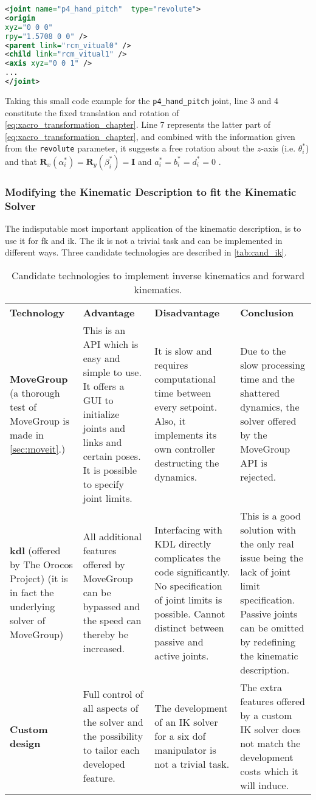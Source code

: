 \begin{lstlisting}[language=xml]
<joint name="p4_hand_pitch"  type="revolute">
<origin
xyz="0 0 0"
rpy="1.5708 0 0" />
<parent link="rcm_vitual0" />
<child link="rcm_vitual1" />
<axis xyz="0 0 1" />
...
</joint>
\end{lstlisting}
Taking this small code example for the \texttt{p4\_hand\_pitch} joint, line 3 and 4 constitute the fixed translation and rotation of \autoref{eq:xacro_transformation_chapter}. Line 7 represents the latter part of \autoref{eq:xacro_transformation_chapter}, and combined with the information given from the \texttt{revolute} parameter, it suggests a free rotation about the $z$-axis (i.e. $\theta_i^*$) and that  $\textbf{R}_x(\alpha_i^*)  = \textbf{R}_y(\beta_i^*) = \mathbf{I}$ and $a_i^* = b_i^* = d_i^* = 0$ .

\subsubsection{Modifying the Kinematic Description to fit the Kinematic Solver}
The indisputable most important application of the kinematic description, is to use it for \gls{fk} and  \gls{ik}. The \gls{ik} is not a trivial task and can be implemented in different ways. Three candidate technologies are described in \autoref{tab:cand_ik}.
\begin{table}[H]
\begin{tabularx}{\textwidth}{X X X X}
\rowcolor{HeaderBlue} 
\textbf{Technology} &  \textbf{Advantage} &  \textbf{Disadvantage} & \textbf{Conclusion} \\
\textbf{MoveGroup} (a thorough test of MoveGroup is made in \autoref{sec:moveit}.) & This is an API which is easy and simple to use. It offers a GUI to initialize joints and links and certain poses. It is possible to specify joint limits. & It is slow and requires computational time between every setpoint. Also, it implements its own controller destructing the dynamics. & Due to the slow processing time and the shattered dynamics, the solver offered by the MoveGroup API is rejected. \\
\rowcolor{textBlue} 
\textbf{\gls{kdl}} (offered by The Orocos Project) (it is in fact the underlying solver of MoveGroup) & All additional features offered by MoveGroup can be bypassed and the speed can thereby be increased. & Interfacing with KDL directly complicates the code significantly. No specification of joint limits is possible. Cannot distinct between passive and active joints. & This is a good solution with the only real issue being the lack of joint limit specification. Passive joints can be omitted by redefining the kinematic description. \\
\textbf{Custom design} & Full control of all aspects of the solver and the possibility to tailor each developed feature. & The development of an IK solver for a six \gls{dof} manipulator is not a trivial task. & The extra features offered by a custom IK solver does not match the development costs which it will induce. \\
\end{tabularx}
	\caption{Candidate technologies to implement inverse kinematics and forward kinematics.}
\label{tab:cand_ik}
\end{table}
